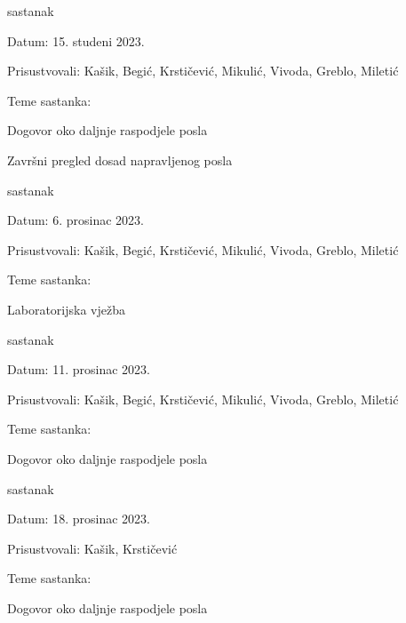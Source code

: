 \begin{packed_enum}
            \item  sastanak
			\item[] \begin{packed_item}
				\item Datum: 15. studeni 2023.
				\item Prisustvovali: Kašik, Begić, Krstičević, Mikulić, Vivoda, Greblo, Miletić
				\item Teme sastanka:
				\begin{packed_item}
					\item  Dogovor oko daljnje raspodjele posla
                    \item  Završni pregled dosad napravljenog posla
				\end{packed_item}
			\end{packed_item}

            \item  sastanak
			\item[] \begin{packed_item}
				\item Datum: 6. prosinac 2023.
				\item Prisustvovali: Kašik, Begić, Krstičević, Mikulić, Vivoda, Greblo, Miletić
				\item Teme sastanka:
				\begin{packed_item}
                    \item  Laboratorijska vježba
				\end{packed_item}
			\end{packed_item}

            \item  sastanak
			\item[] \begin{packed_item}
				\item Datum: 11. prosinac 2023.
				\item Prisustvovali: Kašik, Begić, Krstičević, Mikulić, Vivoda, Greblo, Miletić
				\item Teme sastanka:
				\begin{packed_item}
                    \item  Dogovor oko daljnje raspodjele posla
				\end{packed_item}
			\end{packed_item}

            \item  sastanak
			\item[] \begin{packed_item}
				\item Datum: 18. prosinac 2023.
				\item Prisustvovali: Kašik, Krstičević
				\item Teme sastanka:
				\begin{packed_item}
					\item  Dogovor oko daljnje raspodjele posla
				\end{packed_item}
			\end{packed_item}


\end{packed_enum}
